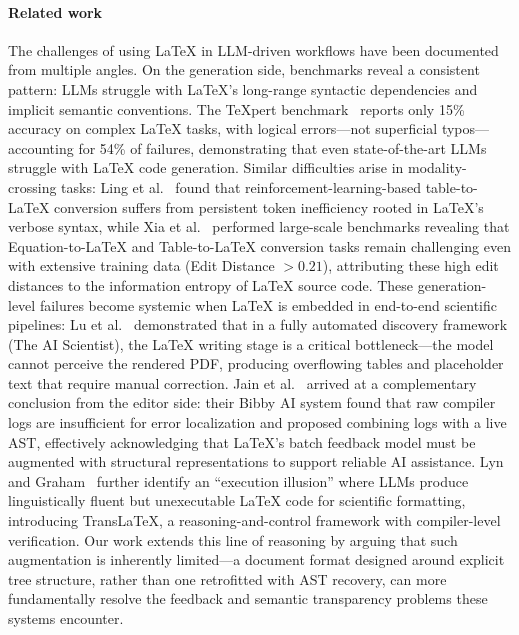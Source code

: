 \paragraph{Related work}
The challenges of using \LaTeX{} in LLM-driven workflows have been documented from multiple angles. On the generation side, benchmarks reveal a consistent pattern: LLMs struggle with \LaTeX{}'s long-range syntactic dependencies and implicit semantic conventions. The TeXpert benchmark~\cite{kale2025texpert} reports only 15\% accuracy on complex \LaTeX{} tasks, with logical errors---not superficial typos---accounting for 54\% of failures, demonstrating that even state-of-the-art LLMs struggle with \LaTeX{} code generation. Similar difficulties arise in modality-crossing tasks: Ling et al.~\cite{ling_table2latex_2025} found that reinforcement-learning-based table-to-\LaTeX{} conversion suffers from persistent token inefficiency rooted in \LaTeX{}'s verbose syntax, while Xia et al.~\cite{xia2024docgenome} performed large-scale benchmarks revealing that Equation-to-\LaTeX{} and Table-to-\LaTeX{} conversion tasks remain challenging even with extensive training data (Edit Distance $> 0.21$), attributing these high edit distances to the information entropy of \LaTeX{} source code. These generation-level failures become systemic when \LaTeX{} is embedded in end-to-end scientific pipelines: Lu et al.~\cite{lu2024aiscientist} demonstrated that in a fully automated discovery framework (The AI Scientist), the \LaTeX{} writing stage is a critical bottleneck---the model cannot perceive the rendered PDF, producing overflowing tables and placeholder text that require manual correction. Jain et al.~\cite{jain2026bibby} arrived at a complementary conclusion from the editor side: their Bibby AI system found that raw compiler logs are insufficient for error localization and proposed combining logs with a live AST, effectively acknowledging that \LaTeX{}'s batch feedback model must be augmented with structural representations to support reliable AI assistance. Lyn and Graham~\cite{lyn2025translatex} further identify an ``execution illusion'' where LLMs produce linguistically fluent but unexecutable \LaTeX{} code for scientific formatting, introducing TransLaTeX, a reasoning-and-control framework with compiler-level verification. Our work extends this line of reasoning by arguing that such augmentation is inherently limited---a document format designed around explicit tree structure, rather than one retrofitted with AST recovery, can more fundamentally resolve the feedback and semantic transparency problems these systems encounter.

